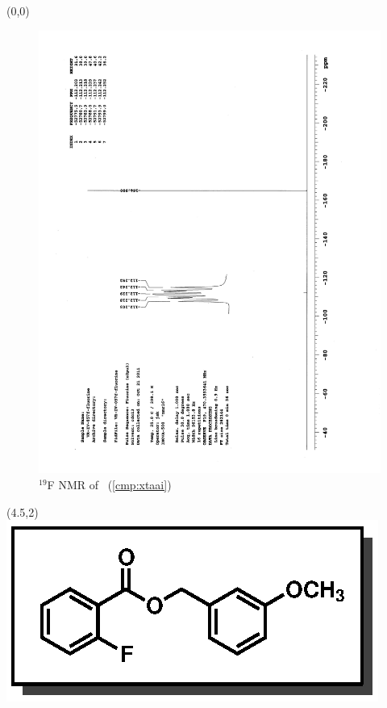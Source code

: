 \clearpage
\begin{textblock}{20}(0,0)
\begin{figure}[htb]
\caption{$^{19}$F NMR of  \CMPxtaai\ (\ref{cmp:xtaai})}
\includegraphics[scale=0.75, trim = 0mm 0mm 0mm 5mm,
clip]{chp_asymmetric/images/nmr/xtaaiF}
\vspace{-100pt}
\end{figure}
\end{textblock}
\begin{textblock}{1}(4.5,2)
\includegraphics[scale=0.8, angle=90]{chp_asymmetric/images/xtaai}
\end{textblock}
\clearpage

